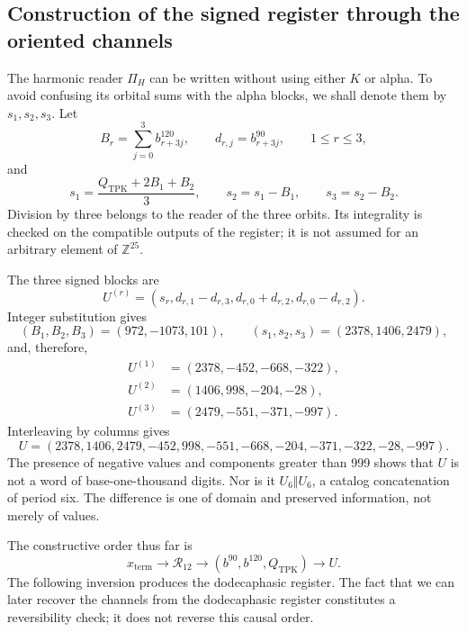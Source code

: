 \subsection{Construction of the signed register through the oriented channels}
\label{x_reciprocidad:subsec:k-pi-h}

The harmonic reader \(\Pi_H\) can be written without using either \(K\) or
alpha. To avoid confusing its orbital sums with the alpha blocks,
we shall denote them by \(s_1,s_2,s_3\). Let
\[
 B_r=\sum_{j=0}^{3}b^{120}_{r+3j},\qquad
 d_{r,j}=b^{90}_{r+3j},\qquad1\leq r\leq3,
\]
and
\begin{equation}
 s_1=\frac{Q_{\mathrm{TPK}}+2B_1+B_2}{3},\qquad
 s_2=s_1-B_1,\qquad s_3=s_2-B_2.
 \label{x_reciprocidad:eq:k-sumas-armonicas}
\end{equation}
Division by three belongs to the reader of the three orbits. Its
integrality is checked on the compatible outputs of the register; it is not
assumed for an arbitrary element of \(\mathbb Z^{25}\).

The three signed blocks are
\begin{equation}
 U^{(r)}=(s_r,d_{r,1}-d_{r,3},d_{r,0}+d_{r,2},d_{r,0}-d_{r,2}).
 \label{x_reciprocidad:eq:k-bloques-firmados}
\end{equation}
Integer substitution gives
\[
 (B_1,B_2,B_3)=(972,-1073,101),\qquad
 (s_1,s_2,s_3)=(2378,1406,2479),
\]
and, therefore,
\begin{align*}
 U^{(1)}&=(2378,-452,-668,-322),\\
 U^{(2)}&=(1406,998,-204,-28),\\
 U^{(3)}&=(2479,-551,-371,-997).
\end{align*}
Interleaving by columns gives
\begin{equation}
 U=(2378,1406,2479,-452,998,-551,
       -668,-204,-371,-322,-28,-997).
 \label{x_reciprocidad:eq:k-u-firmado}
\end{equation}
The presence of negative values and components greater than 999
shows that \(U\) is not a word of base-one-thousand digits. Nor is it
\(U_6\Vert U_6\), a catalog concatenation of period six. The difference
is one of domain and preserved information, not merely of values.

The constructive order thus far is
\[
 x_{\mathrm{term}}\longrightarrow\mathcal R_{12}
 \longrightarrow(b^{90},b^{120},Q_{\mathrm{TPK}})
 \longrightarrow U.
\]
The following inversion produces the dodecaphasic register. The fact that we can later recover
the channels from the dodecaphasic register constitutes a reversibility check; it does not
reverse this causal order.

